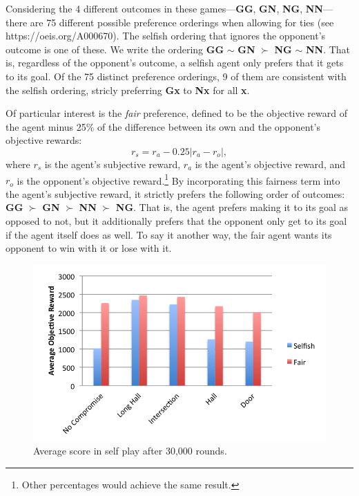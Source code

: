 \documentclass[letterpaper]{article}
\begin{document}

Considering the 4 different outcomes in these games---{\bf GG}, {\bf
GN}, {\bf NG}, {\bf NN}---there are 75 different possible preference
orderings when allowing for ties (see https://oeis.org/A000670). The
selfish ordering that ignores the opponent's outcome is one of
these. We write the ordering {\bf GG} $\sim$ {\bf GN} $\succ$ {\bf NG}
$\sim$ {\bf NN}. That is, regardless of the opponent's outcome, a
selfish agent only prefers that it gets to its goal. Of the 75
distinct preference orderings, 9 of them are consistent with the
selfish ordering, stricly preferring {\bf Gx} to {\bf Nx} for all {\bf
x}.

Of particular interest is the \emph{fair} preference, defined to be
the objective reward of the agent minus 25\% of the difference between
its own and the opponent's objective rewards:
$$r_{s} = r_{a} - 0.25 \left| r_{a} - r_{o} \right|,$$ where $r_{s}$
is the agent's subjective reward, $r_{a}$ is the agent's objective
reward, and $r_{o}$ is the opponent's objective reward.\footnote{Other
percentages would achieve the same result.}  By incorporating this
fairness term into the agent's subjective reward, it strictly prefers
the following order of outcomes: {\bf GG} $\succ$ {\bf GN} $\succ$
{\bf NN} $\succ$ {\bf NG}.  That is, the agent prefers making it to
its goal as opposed to not, but it additionally prefers that the
opponent only get to its goal if the agent itself does as well. To say
it another way, the fair agent wants its opponent to win with it or
lose with it.

\begin{figure}
\centering
\includegraphics[width=0.8\columnwidth]{figures/SelfPlay.png}
\caption{Average score in self play after 30,000 rounds.}
\label{f:selfplay}
\end{figure}
\end{document}
